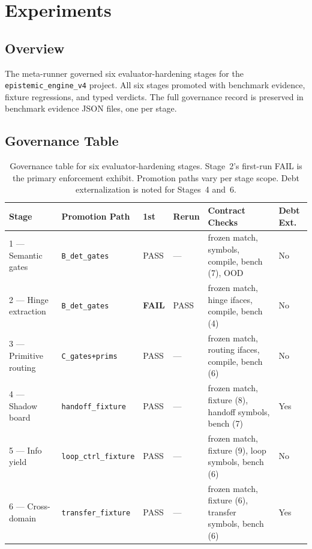 \documentclass[11pt]{article}
\begin{document}
\section{Experiments}

\subsection{Overview}

The meta-runner governed six evaluator-hardening stages for the \texttt{epistemic\_engine\_v4} project. All six stages promoted with benchmark evidence, fixture regressions, and typed verdicts. The full governance record is preserved in benchmark evidence JSON files, one per stage.

\subsection{Governance Table}

\begin{table}[ht]
\centering
\small
\begin{tabular}{@{}lllllp{1.2cm}@{}}
\toprule
Stage & Promotion Path & 1st & Rerun & Contract Checks & Debt Ext. \\
\midrule
1 --- Semantic gates & \texttt{B\_det\_gates} & PASS & --- & frozen match, symbols, compile, bench (7), OOD & No \\
2 --- Hinge extraction & \texttt{B\_det\_gates} & \textbf{FAIL} & PASS & frozen match, hinge ifaces, compile, bench (4) & No \\
3 --- Primitive routing & \texttt{C\_gates+prims} & PASS & --- & frozen match, routing ifaces, compile, bench (6) & No \\
4 --- Shadow board & \texttt{handoff\_fixture} & PASS & --- & frozen match, fixture (8), handoff symbols, bench (7) & Yes \\
5 --- Info yield & \texttt{loop\_ctrl\_fixture} & PASS & --- & frozen match, fixture (9), loop symbols, bench (6) & No \\
6 --- Cross-domain & \texttt{transfer\_fixture} & PASS & --- & frozen match, fixture (6), transfer symbols, bench (6) & Yes \\
\bottomrule
\end{tabular}
\caption{Governance table for six evaluator-hardening stages. Stage~2's first-run FAIL is the primary enforcement exhibit. Promotion paths vary per stage scope. Debt externalization is noted for Stages~4 and~6.}
\label{tab:governance}
\end{table}
\end{document}
